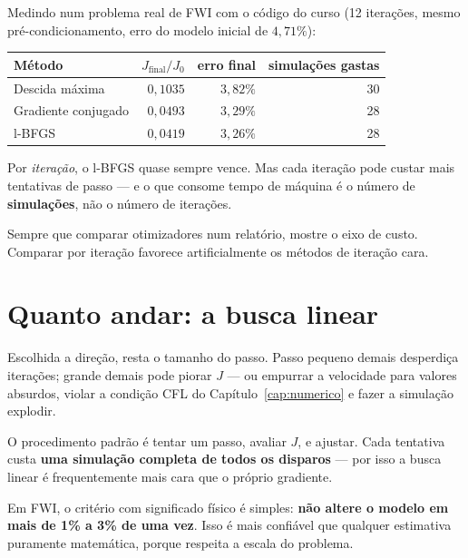 \documentclass[11pt,a4paper,oneside]{report}
\begin{document}
Medindo num problema real de FWI com o c\'odigo do curso (12 itera\c{c}\~oes,
mesmo pr\'e-condicionamento, erro do modelo inicial de $4{,}71\%$):

\begin{center}
\begin{tabular}{@{}lrrr@{}}
\toprule
\textbf{M\'etodo} & $J_{\text{final}}/J_0$ & \textbf{erro final}
& \textbf{simula\c{c}\~oes gastas} \\
\midrule
Descida m\'axima    & $0{,}1035$ & $3{,}82\%$ & 30 \\
Gradiente conjugado & $0{,}0493$ & $3{,}29\%$ & 28 \\
l-BFGS              & $0{,}0419$ & $3{,}26\%$ & 28 \\
\bottomrule
\end{tabular}
\end{center}

\begin{atencao}
Por \emph{itera\c{c}\~ao}, o l-BFGS quase sempre vence. Mas cada itera\c{c}\~ao
pode custar mais tentativas de passo --- e o que consome tempo de m\'aquina
\'e o n\'umero de \textbf{simula\c{c}\~oes}, n\~ao o n\'umero de
itera\c{c}\~oes.

Sempre que comparar otimizadores num relat\'orio, mostre o eixo de custo.
Comparar por itera\c{c}\~ao favorece artificialmente os m\'etodos de
itera\c{c}\~ao cara.
\end{atencao}

\section{Quanto andar: a busca linear}

Escolhida a dire\c{c}\~ao, resta o tamanho do passo. Passo pequeno demais
desperdi\c{c}a itera\c{c}\~oes; grande demais pode piorar $J$ --- ou empurrar
a velocidade para valores absurdos, violar a condi\c{c}\~ao CFL do
Cap\'itulo~\ref{cap:numerico} e fazer a simula\c{c}\~ao explodir.

O procedimento padr\~ao \'e tentar um passo, avaliar $J$, e ajustar. Cada
tentativa custa \textbf{uma simula\c{c}\~ao completa de todos os disparos} ---
por isso a busca linear \'e frequentemente mais cara que o pr\'oprio
gradiente.

\begin{pratica}
Em FWI, o crit\'erio com significado f\'isico \'e simples: \textbf{n\~ao
altere o modelo em mais de 1\% a 3\% de uma vez}. Isso \'e mais confi\'avel
que qualquer estimativa puramente matem\'atica, porque respeita a escala do
problema.
\end{pratica}
\end{document}
